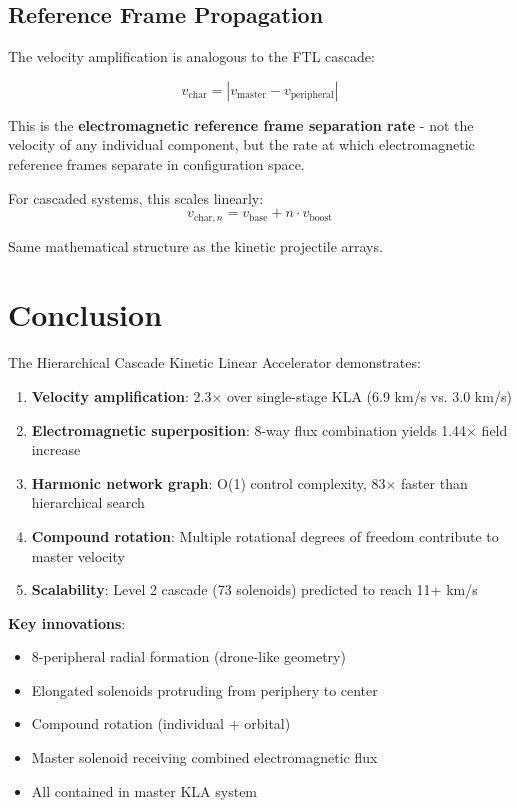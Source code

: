 \documentclass[12pt,a4paper]{article}
\begin{document}
\subsection{Reference Frame Propagation}

The velocity amplification is analogous to the FTL cascade:

\begin{equation}
v_{\text{char}} = |v_{\text{master}} - v_{\text{peripheral}}|
\end{equation}

This is the \textbf{electromagnetic reference frame separation rate} - not the velocity of any individual component, but the rate at which electromagnetic reference frames separate in configuration space.

For cascaded systems, this scales linearly:
\begin{equation}
v_{\text{char},n} = v_{\text{base}} + n \cdot v_{\text{boost}}
\end{equation}

Same mathematical structure as the kinetic projectile arrays.

\section{Conclusion}

The Hierarchical Cascade Kinetic Linear Accelerator demonstrates:

\begin{enumerate}
\item \textbf{Velocity amplification}: 2.3× over single-stage KLA (6.9 km/s vs. 3.0 km/s)
\item \textbf{Electromagnetic superposition}: 8-way flux combination yields 1.44× field increase
\item \textbf{Harmonic network graph}: O(1) control complexity, 83× faster than hierarchical search
\item \textbf{Compound rotation}: Multiple rotational degrees of freedom contribute to master velocity
\item \textbf{Scalability}: Level 2 cascade (73 solenoids) predicted to reach 11+ km/s
\end{enumerate}

\textbf{Key innovations}:
\begin{itemize}
\item 8-peripheral radial formation (drone-like geometry)
\item Elongated solenoids protruding from periphery to center
\item Compound rotation (individual + orbital)
\item Master solenoid receiving combined electromagnetic flux
\item All contained in master KLA system
\end{itemize}
\end{document}
